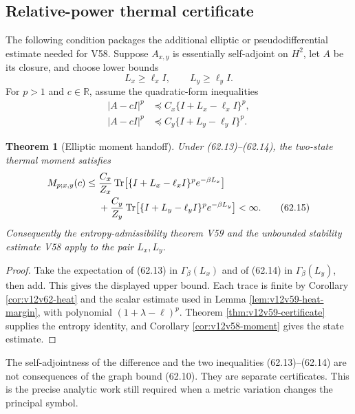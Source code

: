 \documentclass[11pt]{article}
\newtheorem{theorem}{Theorem}[section]
\theoremstyle{remark}
\begin{document}
\subsection{Relative-power thermal certificate}

The following condition packages the additional elliptic or
pseudodifferential estimate needed for V58.  Suppose
\(A_{x,y}\) is essentially self-adjoint on \(H^2\), let \(A\) be its
closure, and choose lower bounds
\[
 L_x\geq\ell_xI,\qquad L_y\geq\ell_yI.
\]
For \(p>1\) and \(c\in\mathbb R\), assume the quadratic-form
inequalities
\begin{align}
 |A-cI|^p
 &\preceq
 C_x\{I+L_x-\ell_xI\}^p,                          \tag{62.13}\\
 |A-cI|^p
 &\preceq
 C_y\{I+L_y-\ell_yI\}^p.                          \tag{62.14}
\end{align}

\begin{theorem}[Elliptic moment handoff]
\label{thm:v12v62-moment-handoff}
Under (62.13)--(62.14), the two-state thermal moment satisfies
\begin{align}
 M_{p;x,y}(c)
 \leq{}&
 {C_x\over Z_x}
 \operatorname{Tr}\!\left[
 \{I+L_x-\ell_xI\}^p e^{-\beta L_x}\right]
 \nonumber\\
 &+
 {C_y\over Z_y}
 \operatorname{Tr}\!\left[
 \{I+L_y-\ell_yI\}^p e^{-\beta L_y}\right]
 <\infty.                                         \tag{62.15}
\end{align}
Consequently the entropy-admissibility theorem V59 and the
unbounded stability estimate V58 apply to the pair \(L_x,L_y\).
\end{theorem}

\begin{proof}
Take the expectation of (62.13) in
\(\Gamma_\beta(L_x)\) and of (62.14) in
\(\Gamma_\beta(L_y)\), then add.  This gives the displayed upper
bound.  Each trace is finite by Corollary
\ref{cor:v12v62-heat} and the scalar estimate used in Lemma
\ref{lem:v12v59-heat-margin}, with polynomial
\((1+\lambda-\ell)^p\).  Theorem
\ref{thm:v12v59-certificate} supplies the entropy identity, and
Corollary \ref{cor:v12v58-moment} gives the state estimate.
\end{proof}

The self-adjointness of the difference and the two inequalities
(62.13)--(62.14) are not consequences of the graph bound (62.10).
They are separate certificates.  This is the precise analytic work
still required when a metric variation changes the principal
symbol.
\end{document}
